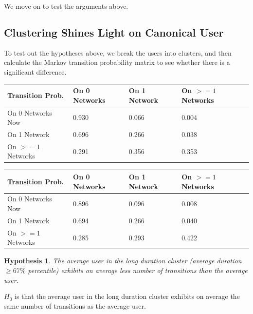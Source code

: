 \documentclass[]{article}
\newtheorem{hyp}{Hypothesis}
\begin{document}
We move on to test the arguments above. 

\subsection{Clustering Shines Light on Canonical User}

To test out the hypotheses above, we break the users into clusters, and then calculate the Markov transition probability matrix to see whether there is a significant difference.

\begin{center}
    \begin{tabular}{| l | l | l | l |}
    \hline
     Transition Prob.& On 0 Networks & On 1 Network & On $>=1$ Networks\\ 
    \hline
    On 0 Networks Now& 0.930 &0.066 & 0.004\\ 
    On 1 Network& 0.696 &0.266 & 0.038\\ 
    On $>=1$ Networks & 0.291 & 0.356 & 0.353\\
    \hline
    \end{tabular}
\end{center}

\begin{center}
    \begin{tabular}{| l | l | l | l |}
    \hline
     Transition Prob.& On 0 Networks & On 1 Network & On $>=1$ Networks\\ 
    \hline
    On 0 Networks Now& 0.896 &0.096 & 0.008\\ 
    On 1 Network& 0.694 &0.266 & 0.040\\ 
    On $>=1$ Networks & 0.285 & 0.293 & 0.422\\
    \hline
    \end{tabular}
\end{center}



\begin{hyp}
The average user in the long duration cluster (average duration $\geq67\%$ percentile) exhibits on average less number of transitions than the average user.
\end{hyp}

$H_0$ is that the average user in the long duration cluster exhibits on average the same number of transitions as the average user.
\end{document}
